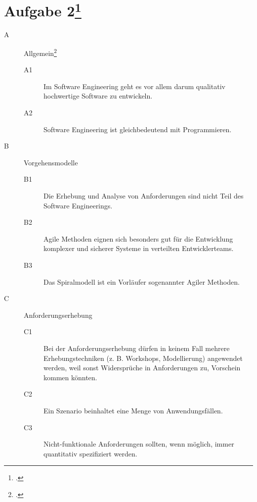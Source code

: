 \documentclass{lehramt-informatik-minimal}
\begin{document}
\section{Aufgabe 2\footcite{sosy:ab:9}}

\begin{description}

%

\item[A] Allgemein\footcite[Herbst 2016 (66116) - Thema 2, Teilaufgabe 2, Aufgabe 1a]{examen:66116:2016:09}

\begin{description}
\item[A1] Im Software Engineering geht es vor allem darum qualitativ
hochwertige Software zu entwickeln.

\item[A2] Software Engineering ist gleichbedeutend mit Programmieren.
\end{description}

%

\item[B] Vorgehensmodelle

\begin{description}
\item[B1] Die Erhebung und Analyse von Anforderungen sind nicht Teil des
Software Engineerings.

\item[B2] Agile Methoden eignen sich besonders gut für die Entwicklung
komplexer und sicherer Systeme in verteilten Entwicklerteams.

\item[B3] Das Spiralmodell ist ein Vorläufer sogenannter Agiler
Methoden.
\end{description}

%

\item[C] Anforderungserhebung

\begin{description}
\item[C1] Bei der Anforderungserhebung dürfen in keinem Fall mehrere
Erhebungstechniken (z. B. Workshops, Modellierung) angewendet werden,
weil sonst Widersprüche in Anforderungen zu, Vorschein kommen könnten.

\item[C2] Ein Szenario beinhaltet eine Menge von Anwendungsfällen.

\item[C3] Nicht-funktionale Anforderungen sollten, wenn möglich, immer
quantitativ spezifiziert werden.
\end{description}


\end{description}
\end{document}
